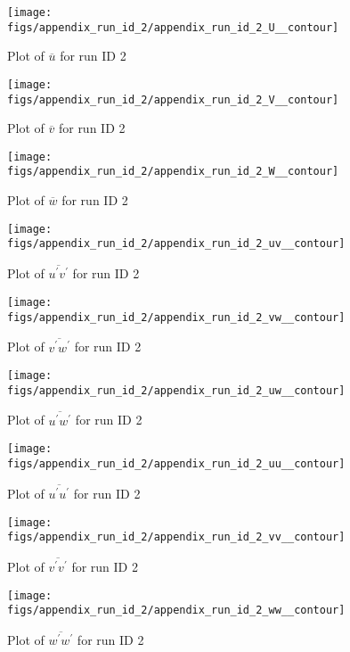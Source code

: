 \begin{figure}[H]
\centering
\texttt{[image: figs/appendix\_run\_id\_2/appendix\_run\_id\_2\_U\_\_contour]}
\caption{Plot of $\overline{u}$ for run ID 2}
\label{fig:appendix_run_id_2_U__contour}
\end{figure}


\begin{figure}[H]
\centering
\texttt{[image: figs/appendix\_run\_id\_2/appendix\_run\_id\_2\_V\_\_contour]}
\caption{Plot of $\overline{v}$ for run ID 2}
\label{fig:appendix_run_id_2_V__contour}
\end{figure}


\begin{figure}[H]
\centering
\texttt{[image: figs/appendix\_run\_id\_2/appendix\_run\_id\_2\_W\_\_contour]}
\caption{Plot of $\overline{w}$ for run ID 2}
\label{fig:appendix_run_id_2_W__contour}
\end{figure}


\begin{figure}[H]
\centering
\texttt{[image: figs/appendix\_run\_id\_2/appendix\_run\_id\_2\_uv\_\_contour]}
\caption{Plot of $\overline{u^\prime v^\prime}$ for run ID 2}
\label{fig:appendix_run_id_2_uv__contour}
\end{figure}


\begin{figure}[H]
\centering
\texttt{[image: figs/appendix\_run\_id\_2/appendix\_run\_id\_2\_vw\_\_contour]}
\caption{Plot of $\overline{v^\prime w^\prime}$ for run ID 2}
\label{fig:appendix_run_id_2_vw__contour}
\end{figure}


\begin{figure}[H]
\centering
\texttt{[image: figs/appendix\_run\_id\_2/appendix\_run\_id\_2\_uw\_\_contour]}
\caption{Plot of $\overline{u^\prime w^\prime}$ for run ID 2}
\label{fig:appendix_run_id_2_uw__contour}
\end{figure}


\begin{figure}[H]
\centering
\texttt{[image: figs/appendix\_run\_id\_2/appendix\_run\_id\_2\_uu\_\_contour]}
\caption{Plot of $\overline{u^\prime u^\prime}$ for run ID 2}
\label{fig:appendix_run_id_2_uu__contour}
\end{figure}


\begin{figure}[H]
\centering
\texttt{[image: figs/appendix\_run\_id\_2/appendix\_run\_id\_2\_vv\_\_contour]}
\caption{Plot of $\overline{v^\prime v^\prime}$ for run ID 2}
\label{fig:appendix_run_id_2_vv__contour}
\end{figure}


\begin{figure}[H]
\centering
\texttt{[image: figs/appendix\_run\_id\_2/appendix\_run\_id\_2\_ww\_\_contour]}
\caption{Plot of $\overline{w^\prime w^\prime}$ for run ID 2}
\label{fig:appendix_run_id_2_ww__contour}
\end{figure}


